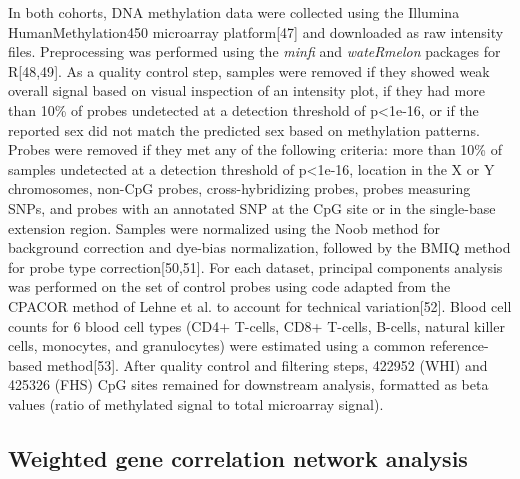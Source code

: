 \documentclass[]{article}
\theoremstyle{definition}
\theoremstyle{definition}
\theoremstyle{definition}
\theoremstyle{remark}
\begin{document}
In both cohorts, DNA methylation data were collected using the Illumina
HumanMethylation450 microarray platform{[}47{]} and downloaded as raw
intensity files. Preprocessing was performed using the \emph{minfi} and
\emph{wateRmelon} packages for R{[}48,49{]}. As a quality control step,
samples were removed if they showed weak overall signal based on visual
inspection of an intensity plot, if they had more than 10\% of probes
undetected at a detection threshold of p\textless{}1e-16, or if the
reported sex did not match the predicted sex based on methylation
patterns. Probes were removed if they met any of the following criteria:
more than 10\% of samples undetected at a detection threshold of
p\textless{}1e-16, location in the X or Y chromosomes, non-CpG probes,
cross-hybridizing probes, probes measuring SNPs, and probes with an
annotated SNP at the CpG site or in the single-base extension region.
Samples were normalized using the Noob method for background correction
and dye-bias normalization, followed by the BMIQ method for probe type
correction{[}50,51{]}. For each dataset, principal components analysis
was performed on the set of control probes using code adapted from the
CPACOR method of Lehne et al. to account for technical
variation{[}52{]}. Blood cell counts for 6 blood cell types (CD4+
T-cells, CD8+ T-cells, B-cells, natural killer cells, monocytes, and
granulocytes) were estimated using a common reference-based
method{[}53{]}. After quality control and filtering steps, 422952 (WHI)
and 425326 (FHS) CpG sites remained for downstream analysis, formatted
as beta values (ratio of methylated signal to total microarray signal).

\subsection{Weighted gene correlation network
analysis}\label{weighted-gene-correlation-network-analysis}
\end{document}
